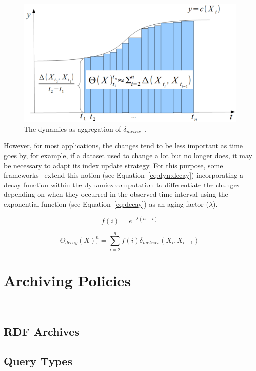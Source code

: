 \documentclass[sw]{iosart2x}
\begin{document}
\begin{figure}[h]
	\centering
	\includegraphics[scale=0.3]{img/d2.png}
	\caption{The dynamics as aggregation of $\delta_{metric}$~\cite{DividinoGSG14}.}
	\label{fig:d2}
\end{figure}

However, for most applications, the changes tend to be less important as time goes by, for example, if a dataset used to change a lot but no longer does, it may be necessary to adapt its index update strategy. For this purpose, some frameworks~\cite{DividinoGSG14, KnuthHS16} extend this notion (see Equation~\ref{eq:dyn:decay}) incorporating a decay function within the dynamics computation to differentiate the changes depending on when they occurred in the observed time interval using the exponential function (see Equation~\ref{eq:decay}) as an aging factor ($\lambda$).

\begin{equation}
\label{eq:decay}
f(i) = e^{-\lambda (n-i)}
\end{equation}

\begin{equation}
\label{eq:dyn:decay}
\Theta_{decay}(X)^{n}_{1} = \sum_{i = 2}^{n} f(i) \delta_{metrics}(X_{i}, X_{i-1})
\end{equation}

\section{Archiving Policies}\label{Archiving}
~\cite{SandersonS12,Papastefanatos13,MeimarisPPGS14}

\subsection{RDF Archives}\label{Archives}
\subsection{Query Types}\label{Types}
\end{document}
